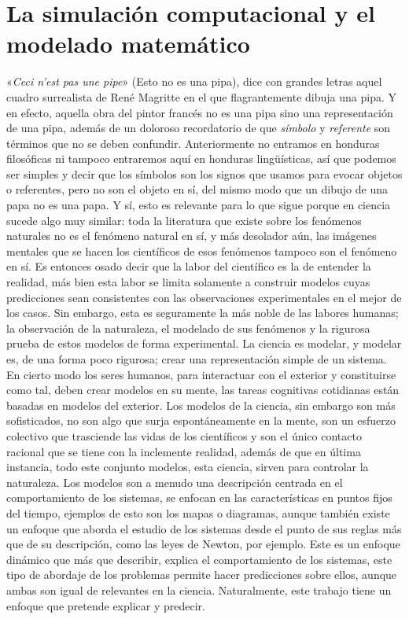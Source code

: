 \section{La simulación computacional y el modelado matemático}
«\textit{Ceci n'est pas une pipe}» (Esto no es una pipa), dice con grandes letras aquel cuadro surrealista de René Magritte en el que flagrantemente dibuja una pipa. Y en efecto, aquella obra del pintor francés no es una pipa sino una representación de una pipa, además de un doloroso recordatorio de que \textit{símbolo} y \textit{referente} son términos que no se deben confundir. Anteriormente no entramos en honduras filosóficas ni tampoco entraremos aquí en honduras lingüísticas, así que podemos ser simples y decir que los símbolos son los signos que usamos para evocar objetos o referentes, pero no son el objeto en sí, del mismo modo que un dibujo de una papa no es una papa. Y sí, esto es relevante para lo que sigue porque en ciencia sucede algo muy similar: toda la literatura que existe sobre los fenómenos naturales no es el fenómeno natural en sí, y más desolador aún, las imágenes mentales que se hacen los científicos de esos fenómenos tampoco son el fenómeno en sí. Es entonces osado decir que la labor del científico es la de entender la realidad, más bien esta labor se limita solamente a construir modelos cuyas predicciones sean consistentes con las observaciones experimentales en el mejor de los casos. Sin embargo, esta es seguramente la más noble de las labores humanas; la observación de la naturaleza, el modelado de sus fenómenos y la rigurosa prueba de estos modelos de forma experimental. La ciencia es modelar, y modelar es, de una forma poco rigurosa; crear una representación simple de un sistema.\newline
En cierto modo los seres humanos, para interactuar con el exterior y constituirse como tal, deben crear modelos en su mente, las tareas cognitivas cotidianas están basadas en modelos del exterior. Los modelos de la ciencia, sin embargo son más sofisticados, no son algo que surja espontáneamente en la mente, son un esfuerzo colectivo que trasciende las vidas de los científicos y son el único contacto racional que se tiene con la inclemente realidad, además de que en última instancia, todo este conjunto modelos, esta ciencia, sirven para controlar la naturaleza. Los modelos son a menudo una descripción centrada en el comportamiento de los sistemas, se enfocan en las características en puntos fijos del tiempo, ejemplos de esto son los mapas o diagramas, aunque también existe un enfoque que aborda el estudio de los sistemas desde el punto de sus reglas más que de su descripción, como las leyes de Newton, por ejemplo. Este es un enfoque dinámico que más que describir, explica el comportamiento de los sistemas, este tipo de abordaje de los problemas permite hacer predicciones sobre ellos, aunque ambas son igual de relevantes en la ciencia. Naturalmente, este trabajo tiene un enfoque que pretende explicar y predecir.\\
